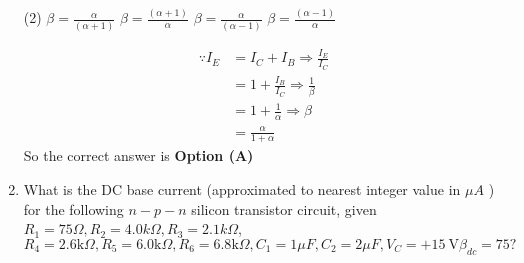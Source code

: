 \begin{enumerate}
\begin{tasks}(2)
\task[\textbf{A.}] $\beta=\frac{\alpha}{(\alpha+1)}$
\task[\textbf{B.}] $\beta=\frac{(\alpha+1)}{\alpha}$
\task[\textbf{C.}] $\beta=\frac{\alpha}{(\alpha-1)}$
\task[\textbf{D.}] $\beta=\frac{(\alpha-1)}{\alpha}$
\end{tasks}
\begin{answer}
\begin{align*}
\because I_{E}&=I_{C}+I_{B} \Rightarrow \frac{I_{E}}{I_{C}}\\&=1+\frac{I_{B}}{I_{C}} \Rightarrow \frac{1}{\beta}\\&=1+\frac{1}{\alpha} \Rightarrow \beta\\&=\frac{\alpha}{1+\alpha}
\end{align*}
So the correct answer is \textbf{Option (A)}
\end{answer}
\item What is the DC base current (approximated to nearest integer value in $\mu A$ ) for the following $n-p-n$ silicon transistor circuit, given $R_{1}=75 \Omega, R_{2}=4.0 k \Omega, R_{3}=2.1 k \Omega$, $R_{4}=2.6 \mathrm{k} \Omega, R_{5}=6.0 \mathrm{k} \Omega, R_{6}=6.8 \mathrm{k} \Omega, C_{1}=1 \mu F, C_{2}=2 \mu F, V_{C}=+15 \mathrm{~V} \beta_{d c}=75 ?$
{}


\end{enumerate}
